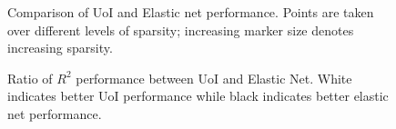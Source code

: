 \documentclass[11pt]{article}
\begin{document}
\begin{figure}[H]
	\centering
	\caption{Comparison of UoI and Elastic net performance. Points are taken over different levels of sparsity; increasing marker size denotes increasing sparsity.}
	\label{fig:exp3-sel-acc}
\end{figure}

\begin{figure}[H]
	\centering
	\caption{Ratio of $R^2$ performance between UoI and Elastic Net. White indicates better UoI performance while black indicates better elastic net performance.}
	\label{fig:exp3-sel-acc}
\end{figure}
\end{document}
